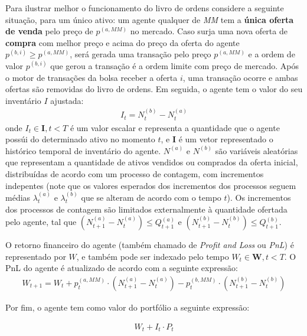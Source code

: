 Para ilustrar melhor o funcionamento do livro de ordens considere a seguinte situação, para um único ativo: um agente qualquer de \textit{MM} tem a \textbf{única oferta de venda} pelo preço de $p^{(a, MM)}$ no mercado. Caso surja uma nova oferta de \textbf{compra} com melhor preço e acima do preço da oferta do agente $p^{(b, i)} \geq p^{(a, MM)}$, será gerada uma transação pelo preço $p^{(a, MM)}$ e a ordem de valor $p^{(b, i)}$ que gerou a transação é a ordem limite com preço de mercado. Após o motor de transações da bolsa receber a oferta $i$, uma transação ocorre e ambas ofertas são removidas do livro de ordens. Em seguida, o agente tem o valor do seu inventário $I$ ajustada:
\begin{equation}
    \begin{aligned}
    	I_{t} = N^{(b)}_{t} - N^{(a)}_{t} 
    \end{aligned}
\end{equation}
onde $I_{t} \in \mathbf{I}, t < T$ é um valor escalar e representa a quantidade que o agente possúi do determinado ativo no momento $t$, e $\mathbf{I}$ é um vetor representado o histórico temporal de inventário do agente. $N^{(a)}$ e $N^{(b)}$ são variáveis aleatórias que representam a quantidade de ativos vendidos ou comprados da oferta inicial, distribuídas de acordo com um processo de contagem, com incrementos indepentes (note que os valores esperados dos incrementos dos processos seguem médias $\lambda_{t}^{(a)}$ e $\lambda_{t}^{(b)}$ que se alteram de acordo com o tempo $t$). Os incrementos dos processos de contagem são limitados externalmente à quantidade ofertada pelo agente, tal que $(N_{t + 1}^{(a)} - N_{t}^{(a)}) \leq Q_{t + 1}^{(a)}$ e $(N_{t + 1}^{(b)} - N_{t}^{(b)}) \leq Q_{t + 1}^{(b)}$.

O retorno financeiro do agente (também chamado de \textit{Profit and Loss} ou \textit{PnL}) é representado por $W$, e também pode ser indexado pelo tempo $W_{t} \in \mathbf{W}, t < T$. O PnL do agente é atualizado de acordo com a seguinte expressão:
\begin{equation}
	\begin{aligned}
		W_{t + 1} = W_{t} + p^{(a, MM)}_{t} \cdot (N^{(a)}_{t + 1} - N^{(a)}_{t}) - p^{(b, MM)}_{t} \cdot (N^{(b)}_{t + 1} - N^{(b)}_{t} )
	\end{aligned}
\end{equation}

Por fim, o agente tem como valor do portfólio a seguinte expressão:

\begin{equation}
	\begin{aligned}
		W_{t} + I_{t} \cdot P_{t}
	\end{aligned}
\end{equation}

